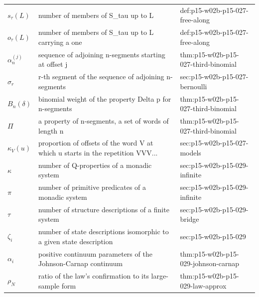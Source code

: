 \begin{longtable}{@{}p{}p{}p{}@{}}
\(s_\tau(L)\) & number of members of S\_tau up to L & def:\allowbreak{}p15-\allowbreak{}w02b-\allowbreak{}p15-\allowbreak{}027-\allowbreak{}free-\allowbreak{}along \\
\(o_\tau(L)\) & number of members of S\_tau up to L carrying a one & def:\allowbreak{}p15-\allowbreak{}w02b-\allowbreak{}p15-\allowbreak{}027-\allowbreak{}free-\allowbreak{}along \\
\(\alpha_n^{(j)}\) & sequence of adjoining n-segments starting at offset j & thm:\allowbreak{}p15-\allowbreak{}w02b-\allowbreak{}p15-\allowbreak{}027-\allowbreak{}third-\allowbreak{}binomial \\
\(\sigma_r\) & r-th segment of the sequence of adjoining n-segments & sec:\allowbreak{}p15-\allowbreak{}w02b-\allowbreak{}p15-\allowbreak{}027-\allowbreak{}bernoulli \\
\(B_n(\delta)\) & binomial weight of the property Delta p for n-segments & thm:\allowbreak{}p15-\allowbreak{}w02b-\allowbreak{}p15-\allowbreak{}027-\allowbreak{}third-\allowbreak{}binomial \\
\(\Pi\) & a property of n-segments, a set of words of length n & thm:\allowbreak{}p15-\allowbreak{}w02b-\allowbreak{}p15-\allowbreak{}027-\allowbreak{}third-\allowbreak{}binomial \\
\(\kappa_V(u)\) & proportion of offsets of the word V at which u starts in the repetition VVV... & sec:\allowbreak{}p15-\allowbreak{}w02b-\allowbreak{}p15-\allowbreak{}027-\allowbreak{}models \\
\(\kappa\) & number of Q-properties of a monadic system & sec:\allowbreak{}p15-\allowbreak{}w02b-\allowbreak{}p15-\allowbreak{}029-\allowbreak{}infinite \\
\(\pi\) & number of primitive predicates of a monadic system & sec:\allowbreak{}p15-\allowbreak{}w02b-\allowbreak{}p15-\allowbreak{}029-\allowbreak{}infinite \\
\(\tau\) & number of structure descriptions of a finite system & sec:\allowbreak{}p15-\allowbreak{}w02b-\allowbreak{}p15-\allowbreak{}029-\allowbreak{}bridge \\
\(\zeta_i\) & number of state descriptions isomorphic to a given state description & sec:\allowbreak{}p15-\allowbreak{}w02b-\allowbreak{}p15-\allowbreak{}029 \\
\(\alpha_i\) & positive continuum parameters of the Johnson-Carnap continuum & thm:\allowbreak{}p15-\allowbreak{}w02b-\allowbreak{}p15-\allowbreak{}029-\allowbreak{}johnson-\allowbreak{}carnap \\
\(\rho_N\) & ratio of the law's confirmation to its large-sample form & thm:\allowbreak{}p15-\allowbreak{}w02b-\allowbreak{}p15-\allowbreak{}029-\allowbreak{}law-\allowbreak{}approx \\

\end{longtable}
